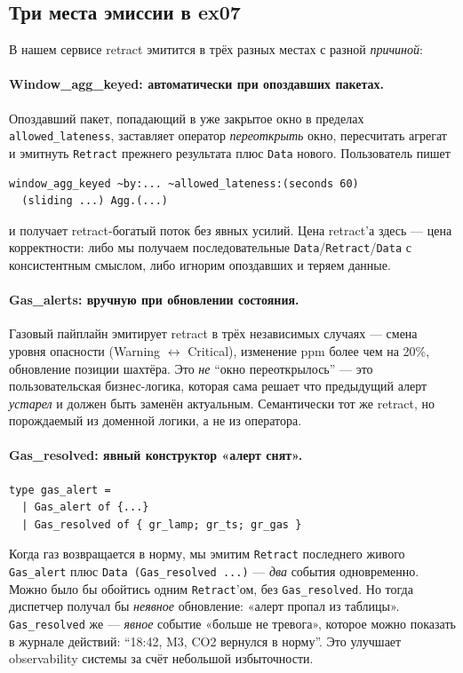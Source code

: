 \subsection{Три места эмиссии в ex07}

В нашем сервисе retract эмитится в трёх разных местах с разной
\emph{причиной}:

\paragraph{Window\_agg\_keyed: автоматически при опоздавших пакетах.}
Опоздавший пакет, попадающий в уже закрытое окно в пределах
\texttt{allowed\_lateness}, заставляет оператор \emph{переоткрыть}
окно, пересчитать агрегат и эмитнуть \texttt{Retract} прежнего
результата плюс \texttt{Data} нового. Пользователь пишет

\begin{lstlisting}
window_agg_keyed ~by:... ~allowed_lateness:(seconds 60)
  (sliding ...) Agg.(...)
\end{lstlisting}

и получает retract-богатый поток без явных усилий. Цена retract'а
здесь --- цена корректности: либо мы получаем последовательные
\texttt{Data}/\texttt{Retract}/\texttt{Data} с консистентным
смыслом, либо игнорим опоздавших и теряем данные.

\paragraph{Gas\_alerts: вручную при обновлении состояния.} Газовый
пайплайн эмитирует retract в трёх независимых случаях --- смена
уровня опасности (Warning $\leftrightarrow$ Critical), изменение
ppm более чем на 20\%, обновление позиции шахтёра. Это \emph{не}
``окно переоткрылось'' --- это пользовательская
бизнес-логика, которая сама решает что предыдущий алерт
\emph{устарел} и должен быть заменён актуальным. Семантически тот же
retract, но порождаемый из доменной логики, а не из оператора.

\paragraph{Gas\_resolved: явный конструктор «алерт снят».}
\begin{lstlisting}
type gas_alert =
  | Gas_alert of {...}
  | Gas_resolved of { gr_lamp; gr_ts; gr_gas }
\end{lstlisting}

Когда газ возвращается в норму, мы эмитим \texttt{Retract} последнего
живого \texttt{Gas\_alert} плюс \texttt{Data (Gas\_resolved ...)} ---
\emph{два} события одновременно. Можно было бы обойтись одним
\texttt{Retract}'ом, без \texttt{Gas\_resolved}. Но тогда диспетчер
получал бы \emph{неявное} обновление: «алерт пропал из таблицы».
\texttt{Gas\_resolved} же --- \emph{явное} событие «больше не
тревога», которое можно показать в журнале действий: ``18:42, M3,
CO2 вернулся в норму''. Это улучшает observability системы за счёт
небольшой избыточности.

